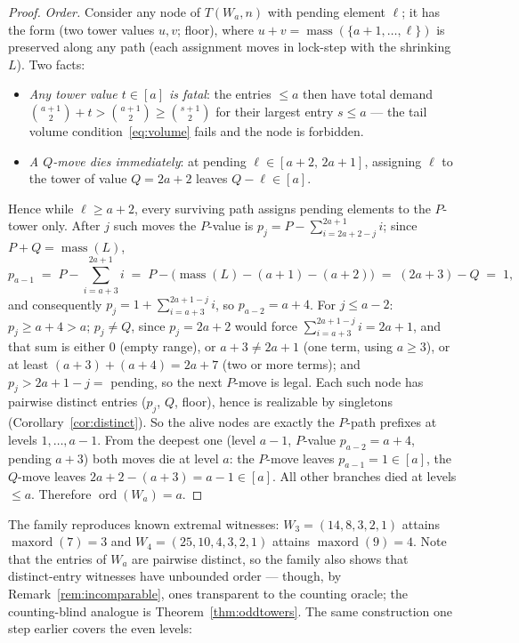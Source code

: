 \documentclass[11pt]{article}
\theoremstyle{definition}
\theoremstyle{remark}
\newcommand{\mass}{\operatorname{mass}}
\newcommand{\ord}{\operatorname{ord}}
\newcommand{\maxord}{\operatorname{maxord}}
\newcommand{\intv}[1]{[#1]}
\begin{document}
\begin{proof}
\emph{Order.} Consider any node of $T(W_a,n)$ with pending element $\ell$; it has
the form (two tower values $u,v$; floor), where $u+v=\mass(\{a+1,\dots,\ell\})$ is
preserved along any path (each assignment moves in lock-step with the shrinking
$L$). Two facts:
\begin{itemize}[itemsep=1pt]
\item \emph{Any tower value $t\in\intv a$ is fatal}: the entries $\le a$ then have
total demand $\binom{a+1}{2}+t>\binom{a+1}{2}\ge\binom{s+1}{2}$ for their largest
entry $s\le a$ --- the tail volume condition~\eqref{eq:volume} fails and the node is
forbidden.
\item \emph{A $Q$-move dies immediately}: at pending $\ell\in[a+2,\,2a+1]$,
assigning $\ell$ to the tower of value $Q=2a+2$ leaves $Q-\ell\in\intv a$.
\end{itemize}
Hence while $\ell\ge a+2$, every surviving path assigns pending elements to the
$P$-tower only. After $j$ such moves the $P$-value is
$p_j=P-\sum_{i=2a+2-j}^{2a+1}i$; since $P+Q=\mass(L)$,
\[
p_{a-1}\;=\;P-\sum_{i=a+3}^{2a+1}i\;=\;P-\bigl(\mass(L)-(a+1)-(a+2)\bigr)
\;=\;(2a+3)-Q\;=\;1,
\]
and consequently $p_j=1+\sum_{i=a+3}^{2a+1-j}i$, so $p_{a-2}=a+4$. For $j\le a-2$: $p_j\ge a+4>a$;
$p_j\neq Q$, since $p_j=2a+2$ would force $\sum_{i=a+3}^{2a+1-j}i=2a+1$, and that
sum is either $0$ (empty range), or $a+3\neq2a+1$ (one term, using $a\ge3$), or at
least $(a+3)+(a+4)=2a+7$ (two or more terms); and $p_j>2a+1-j=$ pending, so the
next $P$-move is legal. Each
such node has pairwise distinct entries ($p_j$, $Q$, floor), hence is realizable by
singletons (Corollary~\ref{cor:distinct}). So the alive nodes are exactly the
$P$-path prefixes at levels $1,\dots,a-1$. From the deepest one (level $a-1$,
$P$-value $p_{a-2}=a+4$, pending $a+3$) both moves die at level $a$: the $P$-move
leaves $p_{a-1}=1\in\intv a$, the $Q$-move leaves $2a+2-(a+3)=a-1\in\intv a$. All
other branches died at levels $\le a$. Therefore $\ord(W_a)=a$.
\end{proof}

The family reproduces known extremal witnesses: $W_3=(14,8,3,2,1)$ attains
$\maxord(7)=3$ and $W_4=(25,10,4,3,2,1)$ attains $\maxord(9)=4$. Note that the
entries of $W_a$ are pairwise distinct, so the family also shows that
distinct-entry witnesses have unbounded order --- though, by
Remark~\ref{rem:incomparable}, ones transparent to the counting oracle; the
counting-blind analogue is Theorem~\ref{thm:oddtowers}. The same
construction one step earlier covers the even levels:
\end{document}
